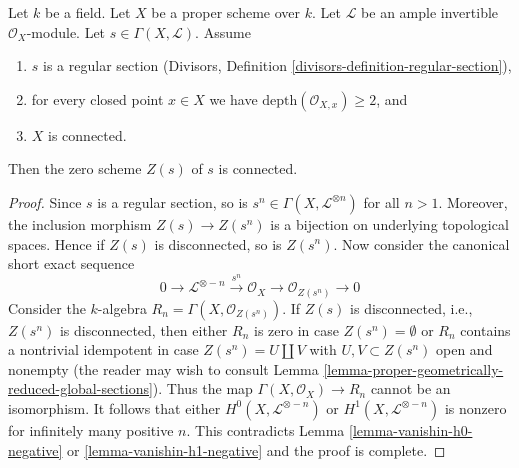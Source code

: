 \begin{lemma}
\label{lemma-connectedness-ample-divisor}
Let $k$ be a field. Let $X$ be a proper scheme over $k$. Let $\mathcal{L}$
be an ample invertible $\mathcal{O}_X$-module. Let
$s \in \Gamma(X, \mathcal{L})$. Assume
\begin{enumerate}
\item $s$ is a regular section
(Divisors, Definition \ref{divisors-definition-regular-section}),
\item for every closed point $x \in X$ we have
$\text{depth}(\mathcal{O}_{X, x}) \geq 2$, and
\item $X$ is connected.
\end{enumerate}
Then the zero scheme $Z(s)$ of $s$ is connected.
\end{lemma}

\begin{proof}
Since $s$ is a regular section, so is
$s^n \in \Gamma(X, \mathcal{L}^{\otimes n})$ for all $n > 1$.
Moreover, the inclusion morphism $Z(s) \to Z(s^n)$ is a bijection
on underlying topological spaces. Hence if $Z(s)$ is disconnected,
so is $Z(s^n)$. Now consider the canonical short exact sequence
$$
0 \to \mathcal{L}^{\otimes -n} \xrightarrow{s^n}
\mathcal{O}_X \to \mathcal{O}_{Z(s^n)} \to 0
$$
Consider the $k$-algebra $R_n = \Gamma(X, \mathcal{O}_{Z(s^n)})$.
If $Z(s)$ is disconnected, i.e., $Z(s^n)$ is disconnected,
then either $R_n$ is zero in case $Z(s^n) = \emptyset$ or
$R_n$ contains a nontrivial idempotent in case $Z(s^n) = U \amalg V$ with
$U, V \subset Z(s^n)$ open and nonempty (the reader may wish to consult
Lemma \ref{lemma-proper-geometrically-reduced-global-sections}).
Thus the map $\Gamma(X, \mathcal{O}_X) \to R_n$ cannot be an isomorphism.
It follows that either $H^0(X, \mathcal{L}^{\otimes -n})$ or
$H^1(X, \mathcal{L}^{\otimes -n})$ is nonzero for infinitely
many positive $n$. This contradicts Lemma \ref{lemma-vanishin-h0-negative} or
\ref{lemma-vanishin-h1-negative}
and the proof is complete.
\end{proof}














